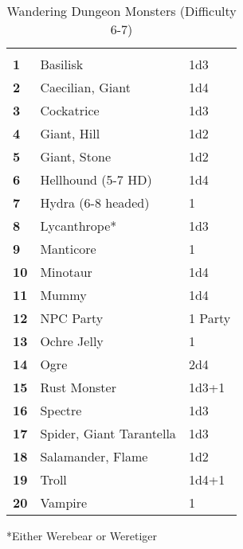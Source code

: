 \begin{multicols*}{2}
\begin {table}[H]
  \caption{Wandering Dungeon Monsters (Difficulty 6-7)}
  \begin{tabularx}{\columnwidth}{>{\bfseries}YYY}
   &  & \\
	1 & Basilisk & 1d3\\
	2 & Caecilian, Giant & 1d4\\
	3 & Cockatrice & 1d3\\
	4 & Giant, Hill & 1d2\\
	5 & Giant, Stone & 1d2\\
	6 & Hellhound (5-7 HD) & 1d4\\
	7 & Hydra (6-8 headed) & 1\\
	8 & Lycanthrope* & 1d3\\
	9 & Manticore & 1\\
	10 & Minotaur & 1d4\\
	11 & Mummy & 1d4\\
	12 & NPC Party & 1 Party\\
	13 & Ochre Jelly & 1\\
	14 & Ogre & 2d4\\
	15 & Rust Monster & 1d3+1\\
	16 & Spectre & 1d3\\
	17 & Spider, Giant Tarantella & 1d3\\
	18 & Salamander, Flame & 1d2\\
	19 & Troll & 1d4+1\\
	20 & Vampire & 1
  \end {tabularx}
	*Either Werebear or Weretiger
\end {table}


\end{multicols*}

